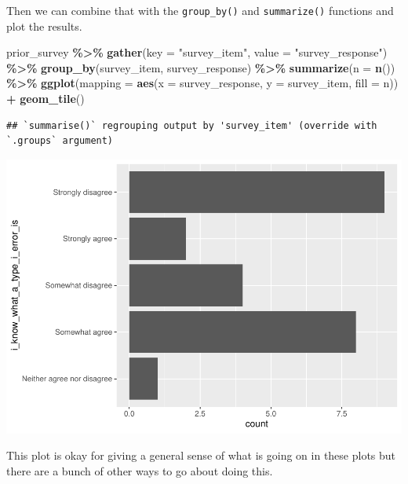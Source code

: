 \documentclass[
]{book}
\newenvironment{Shaded}{\begin{snugshade}}{\end{snugshade}}
\newcommand{\DataTypeTok}[1]{\textcolor[rgb]{0.13,0.29,0.53}{#1}}
\newcommand{\KeywordTok}[1]{\textcolor[rgb]{0.13,0.29,0.53}{\textbf{#1}}}
\newcommand{\NormalTok}[1]{#1}
\newcommand{\OperatorTok}[1]{\textcolor[rgb]{0.81,0.36,0.00}{\textbf{#1}}}
\newcommand{\StringTok}[1]{\textcolor[rgb]{0.31,0.60,0.02}{#1}}
\begin{document}
Then we can combine that with the \texttt{group\_by()} and \texttt{summarize()} functions and plot the results.

\begin{Shaded}
\begin{Highlighting}[]
\NormalTok{prior\_survey }\OperatorTok{\%\textgreater{}\%}\StringTok{ }
\StringTok{  }\KeywordTok{gather}\NormalTok{(}\DataTypeTok{key =} \StringTok{"survey\_item"}\NormalTok{, }\DataTypeTok{value =} \StringTok{"survey\_response"}\NormalTok{) }\OperatorTok{\%\textgreater{}\%}\StringTok{ }
\StringTok{  }\KeywordTok{group\_by}\NormalTok{(survey\_item, survey\_response) }\OperatorTok{\%\textgreater{}\%}\StringTok{ }
\StringTok{  }\KeywordTok{summarize}\NormalTok{(}\DataTypeTok{n =} \KeywordTok{n}\NormalTok{()) }\OperatorTok{\%\textgreater{}\%}\StringTok{ }
\StringTok{  }\KeywordTok{ggplot}\NormalTok{(}\DataTypeTok{mapping =} \KeywordTok{aes}\NormalTok{(}\DataTypeTok{x =}\NormalTok{ survey\_response, }\DataTypeTok{y =}\NormalTok{ survey\_item, }\DataTypeTok{fill =}\NormalTok{ n)) }\OperatorTok{+}
\StringTok{  }\KeywordTok{geom\_tile}\NormalTok{()}
\end{Highlighting}
\end{Shaded}

\begin{verbatim}
## `summarise()` regrouping output by 'survey_item' (override with `.groups` argument)
\end{verbatim}

\includegraphics{test_course_notes_files/figure-latex/unnamed-chunk-12-1.pdf}

This plot is okay for giving a general sense of what is going on in these plots but there are a bunch of other ways to go about doing this.
\end{document}

